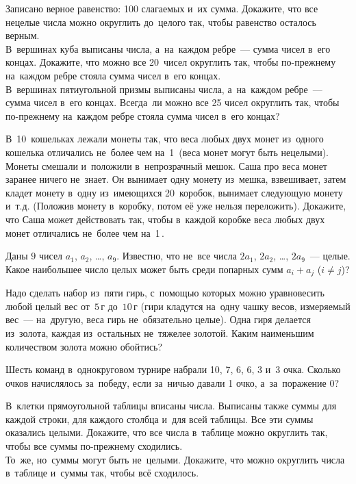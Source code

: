 \begin{exercises}

\item
\subproblem
Записано верное равенство: 100 слагаемых и~их сумма.
Докажите, что все нецелые числа можно округлить до~целого так, чтобы равенство
осталось верным.
\\
\subproblem
В~вершинах куба выписаны числа, а~на~каждом ребре~--- сумма чисел в~его концах.
Докажите, что можно все 20~чисел округлить так, чтобы по-прежнему на~каждом
ребре стояла сумма чисел в~его концах.
\\
\subproblem
В~вершинах пятиугольной призмы выписаны числа, а~на~каждом ребре~--- сумма
чисел в~его концах.
Всегда~ли можно все 25 чисел округлить так, чтобы по-прежнему на~каждом ребре
стояла сумма чисел в~его концах?

\item
В~10~кошельках лежали монеты так, что веса любых двух монет из~одного кошелька
отличались не~более чем на~1\, (веса монет могут быть нецелыми).
Монеты смешали и~положили в~непрозрачный мешок.
Саша про веса монет заранее ничего не~знает.
Он вынимает одну монету из~мешка, взвешивает, затем кладет монету в~одну
из~имеющихся 20~коробок, вынимает следующую монету и~т.д.
(Положив монету в~коробку, потом её уже нельзя переложить).
Докажите, что Саша может действовать так, чтобы в~каждой коробке веса любых
двух монет отличались не~более чем на~1\,.

\item
Даны $9$ чисел $a_{1}$, $a_{2}$, \ldots, $a_{9}$.
Известно, что не~все числа $2 a_{1}$, $2 a_{2}$, \ldots, $2 a_{9}$~--- целые.
Какое наибольшее число целых может быть среди попарных сумм $a_{i} + a_{j}$
($i \neq j$)?

\item
Надо сделать набор из~пяти гирь, с~помощью которых можно уравновесить любой
целый вес от~$5\,\text{г}$ до~$10\,\text{г}$
(гири кладутся на~одну чашку весов, измеряемый вес~--- на~другую, веса гирь
не~обязательно целые).
Одна гиря делается из~золота, каждая из~остальных не~тяжелее золотой.
Каким наименьшим количеством золота можно обойтись?

\item
Шесть команд в~однокруговом турнире набрали 10, 7, 6, 6, 3 и~3 очка.
Сколько очков начислялось за~победу, если за~ничью давали 1 очко,
а~за~поражение 0?

\item
\subproblem
В~клетки прямоугольной таблицы вписаны числа.
Выписаны также суммы для каждой строки, для каждого столбца и~для всей таблицы.
Все эти суммы оказались целыми.
Докажите, что все числа в~таблице можно округлить так, чтобы все суммы
по-прежнему сходились.
\\
\subproblem
То~же, но~суммы могут быть не~целыми.
Докажите, что можно округлить числа в~таблице и~суммы так, чтобы всё сходилось.

\end{exercises}

